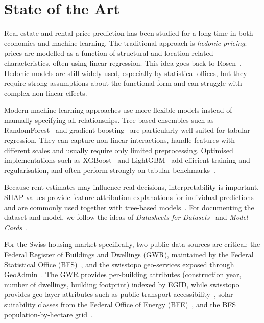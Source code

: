 \documentclass[11pt,a4paper]{article}
\begin{document}
\section{State of the Art}
\label{sec:sota}

Real-estate and rental-price prediction has been studied for a long time in both economics and machine learning. The traditional approach is \emph{hedonic pricing}: prices are modelled as a function of structural and location-related characteristics, often using linear regression. This idea goes back to Rosen~\citep{rosen1974hedonic}. Hedonic models are still widely used, especially by statistical offices, but they require strong assumptions about the functional form and can struggle with complex non-linear effects.

Modern machine-learning approaches use more flexible models instead of manually specifying all relationships. Tree-based ensembles such as RandomForest~\citep{breiman2001randomforest} and gradient boosting~\citep{friedman2001gbm} are particularly well suited for tabular regression. They can capture non-linear interactions, handle features with different scales and usually require only limited preprocessing. Optimised implementations such as XGBoost~\citep{chen2016xgboost} and LightGBM~\citep{ke2017lightgbm} add efficient training and regularisation, and often perform strongly on tabular benchmarks~\citep{shwartz2022tabular}.

Because rent estimates may influence real decisions, interpretability is important. SHAP values provide feature-attribution explanations for individual predictions and are commonly used together with tree-based models~\citep{lundberg2017shap}. For documenting the dataset and model, we follow the ideas of \emph{Datasheets for Datasets}~\citep{gebru2021datasheets} and \emph{Model Cards}~\citep{mitchell2019modelcards}.

For the Swiss housing market specifically, two public data sources are critical: the Federal Register of Buildings and Dwellings (GWR), maintained by the Federal Statistical Office (BFS)~\citep{bfsGwr}, and the swisstopo geo-services exposed through GeoAdmin~\citep{geoAdminApi}. The GWR provides per-building attributes (construction year, number of dwellings, building footprint) indexed by EGID, while swisstopo provides geo-layer attributes such as public-transport accessibility~\citep{areOevKlassen}, solar-suitability classes from the Federal Office of Energy (BFE)~\citep{bfeSolar}, and the BFS population-by-hectare grid~\citep{bfsPopulation}.
\end{document}
